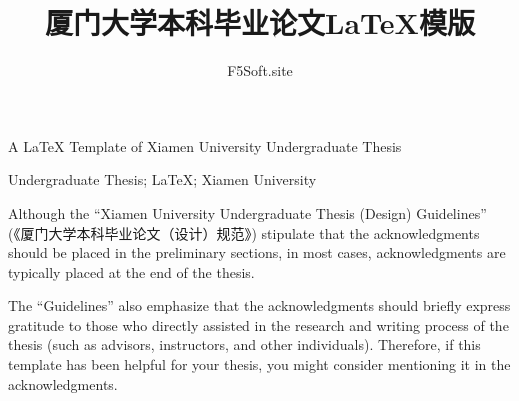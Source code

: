 \documentclass{xmu}
\begin{document}
\print

\arabicchapter



\title{厦门大学本科毕业论文LaTeX模版}
{A LaTeX Template of Xiamen University Undergraduate Thesis}

\author{F5Soft.site}



\subject{计算机科学与技术}





{Undergraduate Thesis; LaTeX; Xiamen University}

\maketitle


\begin{acknowledgement}
    Although the ``Xiamen University Undergraduate Thesis (Design) Guidelines'' (《厦门大学本科毕业论文（设计）规范》) stipulate that the acknowledgments should be placed in the preliminary sections, in most cases, acknowledgments are typically placed at the end of the thesis.
    \par
    The ``Guidelines'' also emphasize that the acknowledgments should briefly express gratitude to those who directly assisted in the research and writing process of the thesis (such as advisors, instructors, and other individuals).
    Therefore, if this template has been helpful for your thesis, you might consider mentioning it in the acknowledgments.
\end{acknowledgement}
\end{document}
